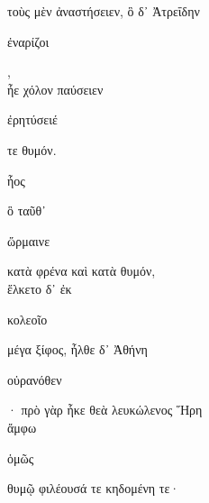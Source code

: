 \documentclass{ransom}
\begin{document}
\begin{foreignpage}
\begin{graytext}
τοὺς μὲν ἀναστήσειεν, ὃ δ᾽ Ἀτρεΐδην \begin{whitetext}ἐναρίζοι\end{whitetext},\\
ἦε χόλον παύσειεν \begin{whitetext}ἐρητύσειέ\end{whitetext} τε θυμόν.\\
\begin{whitetext}ἧος\end{whitetext} ὃ ταῦθ᾽ \begin{whitetext}ὥρμαινε\end{whitetext} κατὰ φρένα καὶ κατὰ θυμόν,\\
ἕλκετο δ᾽ ἐκ \begin{whitetext}κολεοῖο\end{whitetext} μέγα ξίφος, ἦλθε δ᾽ Ἀθήνη\\
\begin{whitetext}οὐρανόθεν\end{whitetext}· πρὸ γὰρ ἧκε θεὰ λευκώλενος Ἥρη\hfill{}\\
ἄμφω \begin{whitetext}ὁμῶς\end{whitetext} θυμῷ φιλέουσά τε κηδομένη τε·\\

\end{graytext}


\end{foreignpage}
\end{document}
